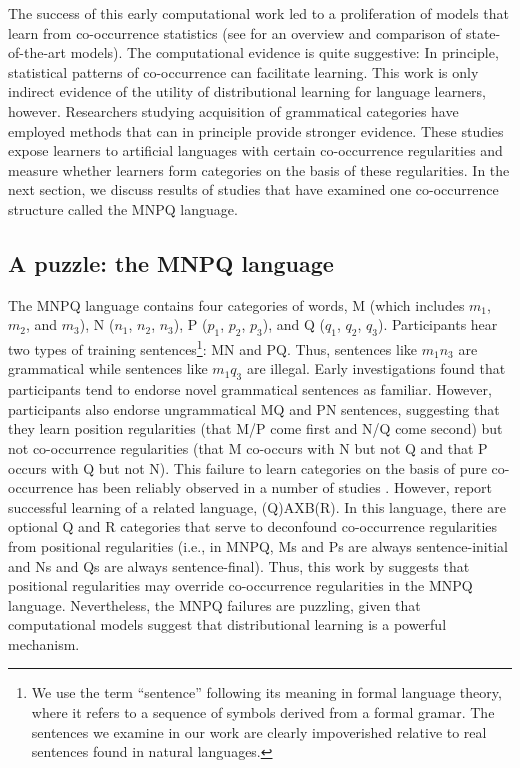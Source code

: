 \documentclass[man,longtable,floatsintext]{my-apa6}
\begin{document}
The success of this early computational work led to a proliferation of models that learn from co-occurrence statistics (see \citealp{riordan2010} for an overview and comparison of state-of-the-art models). The computational evidence is quite suggestive: In principle, statistical patterns of co-occurrence can facilitate learning. This work is only indirect evidence of the utility of distributional learning for language learners, however. Researchers studying acquisition of grammatical categories have employed methods that can in principle provide stronger evidence. These studies expose learners to artificial languages with certain co-occurrence regularities and measure whether learners form categories on the basis of these regularities. In the next section, we discuss results of studies that have examined one co-occurrence structure called the MNPQ language.

\subsection{A puzzle: the MNPQ language}

The MNPQ language contains four categories of words, M (which includes $m_1$, $m_2$, and $m_3$), N ($n_1$, $n_2$, $n_3$), P ($p_1$, $p_2$, $p_3$), and Q ($q_1$, $q_2$, $q_3$). Participants hear two types of training sentences\footnote{ We use the term ``sentence'' following its meaning in formal language theory, where it refers to a sequence of symbols derived from a formal gramar. The sentences we examine in our work are clearly impoverished relative to real sentences found in natural languages.}: MN and PQ. Thus, sentences like $m_1 n_3$ are grammatical while sentences like $m_1 q_3$ are illegal. Early investigations \citep{braine1966, smith1966} found that participants tend to endorse novel grammatical sentences as familiar. However, participants also endorse ungrammatical MQ and PN sentences, suggesting that they learn position regularities (that M/P come first and N/Q come second) but not co-occurrence regularities (that M co-occurs with N but not Q and that P occurs with Q but not N). This failure to learn categories on the basis of pure co-occurrence has been reliably observed in a number of studies \citep{braine1987, brooks1993, frigo1998, kempe2001, gerken2005, lany2010, frank2011}. However, \citet[Experiment 5]{reeder2009} report successful learning of a related language, (Q)AXB(R). In this language, there are optional Q and R categories that serve to deconfound co-occurrence regularities from positional regularities (i.e., in MNPQ, Ms and Ps are always sentence-initial and Ns and Qs are always sentence-final). Thus, this work by \citeauthor{reeder2009} suggests that positional regularities may override co-occurrence regularities in the MNPQ language. Nevertheless, the MNPQ failures are puzzling, given that computational models suggest that distributional learning is a powerful mechanism.
\end{document}
